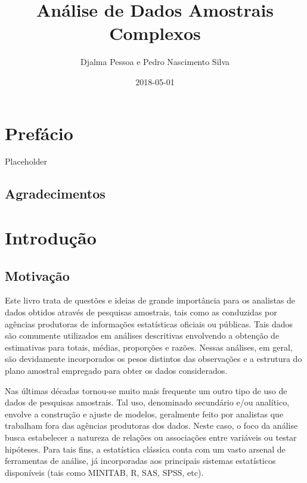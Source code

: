 \documentclass[
]{book}
\title{Análise de Dados Amostrais Complexos}
\author{Djalma Pessoa e Pedro Nascimento Silva}
\date{2018-05-01}
\begin{document}
\maketitle

{
\setcounter{tocdepth}{1}
\tableofcontents
}
\hypertarget{prefuxe1cio}{%
\chapter*{Prefácio}\label{prefuxe1cio}}

Placeholder

\hypertarget{agradecimentos}{%
\section*{Agradecimentos}\label{agradecimentos}}

\hypertarget{introduc}{%
\chapter{Introdução}\label{introduc}}

\hypertarget{motivauxe7uxe3o}{%
\section{Motivação}\label{motivauxe7uxe3o}}

Este livro trata de questões e ideias de grande importância para os analistas de dados obtidos através de pesquisas amostrais, tais como as conduzidas por agências produtoras de informações estatísticas oficiais ou públicas. Tais dados são comumente utilizados em análises descritivas envolvendo a obtenção de estimativas para totais, médias, proporções e razões. Nessas análises, em geral, são devidamente incorporados os pesos distintos das observações e a estrutura do plano amostral empregado para obter os dados considerados.

Nas últimas décadas tornou-se muito mais frequente um outro tipo de uso de dados de pesquisas amostrais. Tal uso, denominado secundário e/ou analítico, envolve a construção e ajuste de modelos, geralmente feito por analistas que trabalham fora das agências produtoras dos dados. Neste caso, o foco da análise busca estabelecer a natureza de relações ou associações entre variáveis ou testar hipóteses. Para tais fins, a estatística clássica conta com um vasto arsenal de ferramentas de análise, já incorporadas aos principais sistemas estatísticos disponíveis (tais como MINITAB, R, SAS, SPSS, etc).
\end{document}
